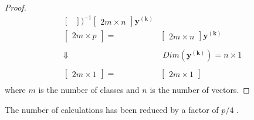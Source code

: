\begin{proof}
\begin{equation*}
\begin{split}
\begin{bmatrix}
	\end{bmatrix} \biggr)^{-1} 
	\begin{bmatrix}
		2m \times n 
	\end{bmatrix} \mathbf{y^{(k)}} \\ %
	\begin{bmatrix}
		2m \times p
	\end{bmatrix}
	= &
	\begin{bmatrix}
		2m \times n 
	\end{bmatrix} \mathbf{y^{(k)}} \\ %
	& \\
	\Downarrow & \; Dim(\mathbf{y^{(k)}}) = n \times 1 \\ %
	& \\
	\begin{bmatrix}
		2m \times 1
	\end{bmatrix}
	= &
	\begin{bmatrix}
		2m \times 1 
	\end{bmatrix} \\ %
	\end{split}
\end{equation*}
where $m$ is the number of classes and $n$ is the number of vectors.
\end{proof} 
The number of calculations has been reduced by a factor of $p/4$ \cite{stylianou98}.


